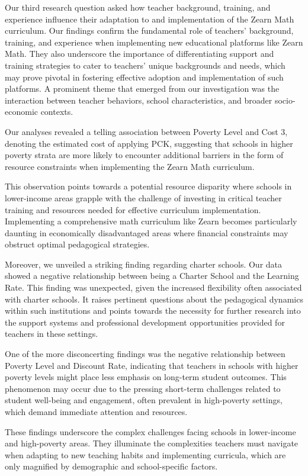 \documentclass[
  number,
  preprint,
  3p,
  onecolumn]{elsarticle}
\begin{document}
Our third research question asked how teacher background, training, and
experience influence their adaptation to and implementation of the Zearn
Math curriculum. Our findings confirm the fundamental role of teachers'
background, training, and experience when implementing new educational
platforms like Zearn Math. They also underscore the importance of
differentiating support and training strategies to cater to teachers'
unique backgrounds and needs, which may prove pivotal in fostering
effective adoption and implementation of such platforms. A prominent
theme that emerged from our investigation was the interaction between
teacher behaviors, school characteristics, and broader socio-economic
contexts.

Our analyses revealed a telling association between Poverty Level and
Cost 3, denoting the estimated cost of applying PCK, suggesting that
schools in higher poverty strata are more likely to encounter additional
barriers in the form of resource constraints when implementing the Zearn
Math curriculum.

This observation points towards a potential resource disparity where
schools in lower-income areas grapple with the challenge of investing in
critical teacher training and resources needed for effective curriculum
implementation. Implementing a comprehensive math curriculum like Zearn
becomes particularly daunting in economically disadvantaged areas where
financial constraints may obstruct optimal pedagogical strategies.

Moreover, we unveiled a striking finding regarding charter schools. Our
data showed a negative relationship between being a Charter School and
the Learning Rate. This finding was unexpected, given the increased
flexibility often associated with charter schools. It raises pertinent
questions about the pedagogical dynamics within such institutions and
points towards the necessity for further research into the support
systems and professional development opportunities provided for teachers
in these settings.

One of the more disconcerting findings was the negative relationship
between Poverty Level and Discount Rate, indicating that teachers in
schools with higher poverty levels might place less emphasis on
long-term student outcomes. This phenomenon may occur due to the
pressing short-term challenges related to student well-being and
engagement, often prevalent in high-poverty settings, which demand
immediate attention and resources.

These findings underscore the complex challenges facing schools in
lower-income and high-poverty areas. They illuminate the complexities
teachers must navigate when adapting to new teaching habits and
implementing curricula, which are only magnified by demographic and
school-specific factors.
\end{document}
